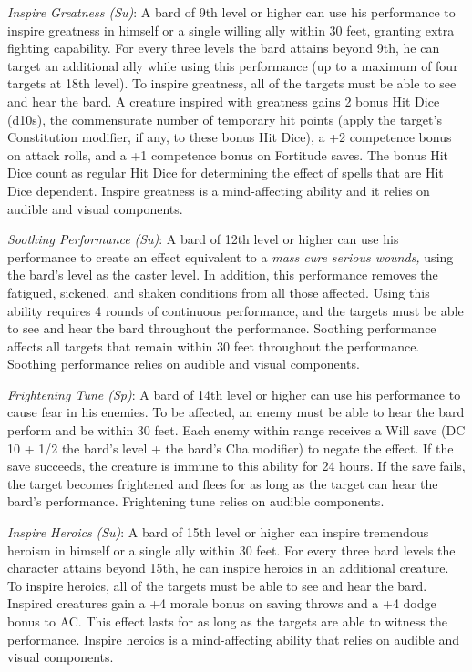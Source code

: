 \textit{Inspire Greatness (Su)}: A bard of 9th level or higher can use his performance to inspire greatness in himself or a single willing ally within 30 feet, granting extra fighting capability. For every three levels the bard attains beyond 9th, he can target an additional ally while using this performance (up to a maximum of four targets at 18th level). To inspire greatness, all of the targets must be able to see and hear the bard. A creature inspired with greatness gains 2 bonus Hit Dice (d10s), the commensurate number of temporary hit points (apply the target's Constitution modifier, if any, to these bonus Hit Dice), a +2 competence bonus on attack rolls, and a +1 competence bonus on Fortitude saves. The bonus Hit Dice count as regular Hit Dice for determining the effect of spells that are Hit Dice dependent. Inspire greatness is a mind-affecting ability and it relies on audible and visual components.
				
\textit{Soothing Performance} \textit{(Su)}: A bard of 12th level or higher can use his performance to create an effect equivalent to a \textit{mass cure serious wounds, }using the bard's level as the caster level. In addition, this performance removes the fatigued, sickened, and shaken conditions from all those affected. Using this ability requires 4 rounds of continuous performance, and the targets must be able to see and hear the bard throughout the performance. Soothing performance affects all targets that remain within 30 feet throughout the performance. Soothing performance relies on audible and visual components.
				
\textit{Frightening Tune (Sp)}: A bard of 14th level or higher can use his performance to cause fear in his enemies. To be affected, an enemy must be able to hear the bard perform and be within 30 feet. Each enemy within range receives a Will save (DC 10 + 1/2 the bard's level + the bard's Cha modifier) to negate the effect. If the save succeeds, the creature is immune to this ability for 24 hours. If the save fails, the target becomes frightened and flees for as long as the target can hear the bard's performance. Frightening tune relies on audible components.
				
\textit{Inspire Heroics} \textit{(Su)}: A bard of 15th level or higher can inspire tremendous heroism in himself or a single ally within 30 feet. For every three bard levels the character attains beyond 15th, he can inspire heroics in an additional creature. To inspire heroics, all of the targets must be able to see and hear the bard. Inspired creatures gain a +4 morale bonus on saving throws and a +4 dodge bonus to AC. This effect lasts for as long as the targets are able to witness the performance. Inspire heroics is a mind-affecting ability that relies on audible and visual components.
				
